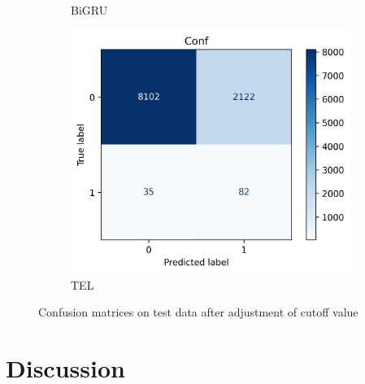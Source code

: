 \documentclass[utf8x]{ctexart}
\begin{document}
\begin{figure}[htb]
\begin{subfigure}[b]{0.32\textwidth}
    \caption{BiGRU}
    \label{fig:BiGRUc_test_conf}
  \end{subfigure}
  \begin{subfigure}[b]{0.32\textwidth}
    \centering
    \includegraphics[width=\textwidth]{../images/Transformerc_test_conf.png}
    \caption{TEL}
    \label{fig:Transformerc_test_conf}
  \end{subfigure}

  \caption{Confusion matrices on test data after adjustment of cutoff value}
  \label{fig:confadjusted}
\end{figure}



\section{Discussion}
\end{document}
